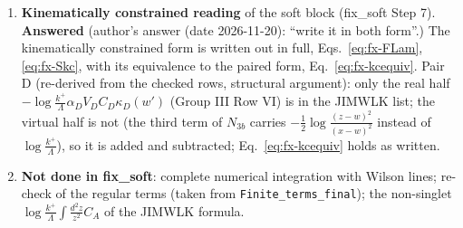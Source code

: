 {\begin{enumerate}
\item \textbf{Kinematically constrained reading} of the soft block (fix\_soft Step 7). \textbf{Answered} (author's answer (date 2026-11-20): ``write it in both form''.) The kinematically constrained form is written out in full, Eqs.~\eqref{eq:fx-FLam}, \eqref{eq:fx-Skc}, with its equivalence to the paired form, Eq.~\eqref{eq:fx-kcequiv}. Pair D (re-derived from the checked rows, structural argument): only the real half $-\log\frac{k^{+}}{\Lambda}\alpha_{D}V_{D}C_{D}\kappa_{D}(w')$ (Group III Row VI) is in the JIMWLK list; the virtual half is not (the third term of $N_{3b}$ carries $-\frac12\log\frac{(z-w)^{2}}{(x-w)^{2}}$ instead of $\log\frac{k^{+}}{\Lambda}$), so it is added and subtracted; Eq.~\eqref{eq:fx-kcequiv} holds as written.
\item \textbf{Not done in fix\_soft}: complete numerical integration with Wilson lines; re-check of the regular terms (taken from \texttt{Finite\_terms\_final}); the non-singlet $\log\frac{k^{+}}{\Lambda}\int\frac{d^{2}z}{z^{2}}C_{A}$ of the JIMWLK formula.
\end{enumerate}}\par
